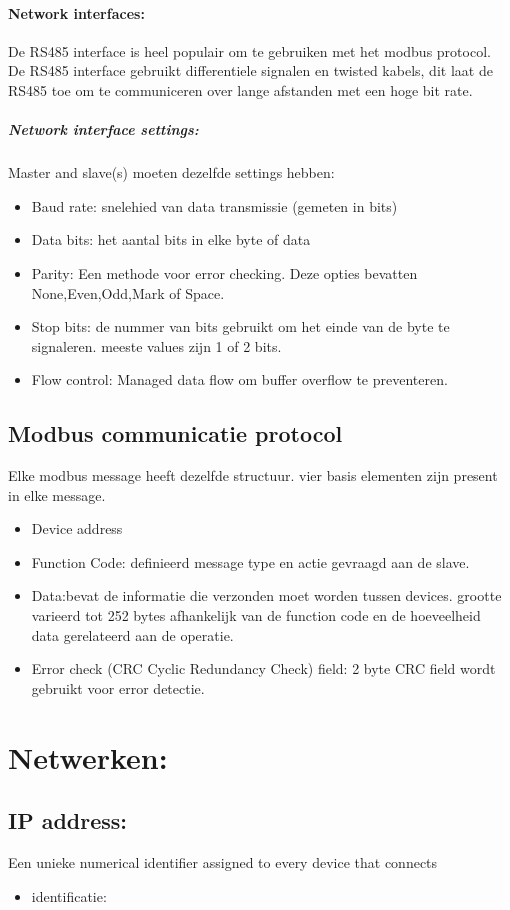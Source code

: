 \documentclass[12pt]{article}
\begin{document}
\paragraph{Network interfaces:}
De RS485 interface is heel populair om te gebruiken met het modbus protocol. De RS485 interface gebruikt differentiele signalen en twisted kabels, dit laat de RS485 toe om te communiceren over lange afstanden met een hoge bit rate.
\subparagraph{Network interface settings:}
Master and slave(s) moeten dezelfde settings hebben:
\begin{itemize}
    \item Baud rate: snelehied van data transmissie (gemeten in bits)
    \item Data bits: het aantal bits in elke byte of data
    \item Parity: Een methode voor error checking. Deze opties bevatten None,Even,Odd,Mark of Space.
    \item Stop bits: de nummer van bits gebruikt om het einde van de byte te signaleren. meeste values zijn 1 of 2 bits.
    \item Flow control: Managed data flow om buffer overflow te preventeren.
\end{itemize}
\subsection{Modbus communicatie protocol}
Elke modbus message heeft dezelfde structuur. vier basis elementen zijn present in elke message.\begin{itemize}
    \item Device address
    \item Function Code: definieerd message type en actie gevraagd aan de slave.
    \item Data:bevat de informatie die verzonden moet worden tussen devices. grootte varieerd tot 252 bytes afhankelijk van de function code en de hoeveelheid data gerelateerd aan de operatie.
    \item Error check (CRC Cyclic Redundancy Check) field: 2 byte CRC field wordt gebruikt voor error detectie.
\end{itemize}
\section{Netwerken:}
\subsection{IP address:}
Een unieke numerical identifier assigned to every device that connects
\begin{itemize}
    \item identificatie:
\end{itemize}
\end{document}
